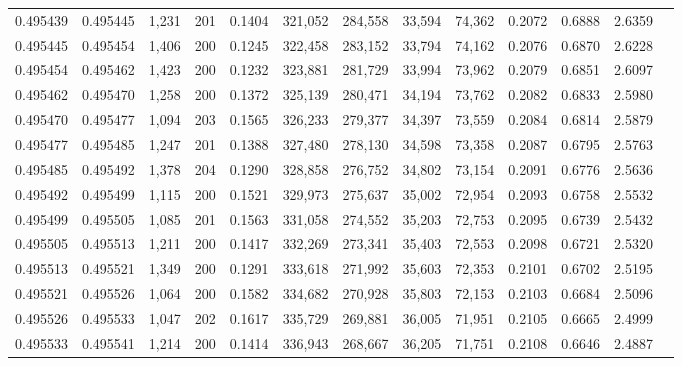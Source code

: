 \begin{tabular}{rrrrrrrrrrrrr}
0.495439 & 0.495445 & 1,231 & 201 &                                     0.1404 & 321,052 & 284,558 &  33,594 &  74,362 & 0.2072 & 0.6888 & 2.6359 \\
0.495445 & 0.495454 & 1,406 & 200 &                                     0.1245 & 322,458 & 283,152 &  33,794 &  74,162 & 0.2076 & 0.6870 & 2.6228 \\
0.495454 & 0.495462 & 1,423 & 200 &                                     0.1232 & 323,881 & 281,729 &  33,994 &  73,962 & 0.2079 & 0.6851 & 2.6097 \\
0.495462 & 0.495470 & 1,258 & 200 &                                     0.1372 & 325,139 & 280,471 &  34,194 &  73,762 & 0.2082 & 0.6833 & 2.5980 \\
0.495470 & 0.495477 & 1,094 & 203 &                                     0.1565 & 326,233 & 279,377 &  34,397 &  73,559 & 0.2084 & 0.6814 & 2.5879 \\
0.495477 & 0.495485 & 1,247 & 201 &                                     0.1388 & 327,480 & 278,130 &  34,598 &  73,358 & 0.2087 & 0.6795 & 2.5763 \\
0.495485 & 0.495492 & 1,378 & 204 &                                     0.1290 & 328,858 & 276,752 &  34,802 &  73,154 & 0.2091 & 0.6776 & 2.5636 \\
0.495492 & 0.495499 & 1,115 & 200 &                                     0.1521 & 329,973 & 275,637 &  35,002 &  72,954 & 0.2093 & 0.6758 & 2.5532 \\
0.495499 & 0.495505 & 1,085 & 201 &                                     0.1563 & 331,058 & 274,552 &  35,203 &  72,753 & 0.2095 & 0.6739 & 2.5432 \\
0.495505 & 0.495513 & 1,211 & 200 &                                     0.1417 & 332,269 & 273,341 &  35,403 &  72,553 & 0.2098 & 0.6721 & 2.5320 \\
0.495513 & 0.495521 & 1,349 & 200 &                                     0.1291 & 333,618 & 271,992 &  35,603 &  72,353 & 0.2101 & 0.6702 & 2.5195 \\
0.495521 & 0.495526 & 1,064 & 200 &                                     0.1582 & 334,682 & 270,928 &  35,803 &  72,153 & 0.2103 & 0.6684 & 2.5096 \\
0.495526 & 0.495533 & 1,047 & 202 &                                     0.1617 & 335,729 & 269,881 &  36,005 &  71,951 & 0.2105 & 0.6665 & 2.4999 \\
0.495533 & 0.495541 & 1,214 & 200 &                                     0.1414 & 336,943 & 268,667 &  36,205 &  71,751 & 0.2108 & 0.6646 & 2.4887 \\

\end{tabular}
